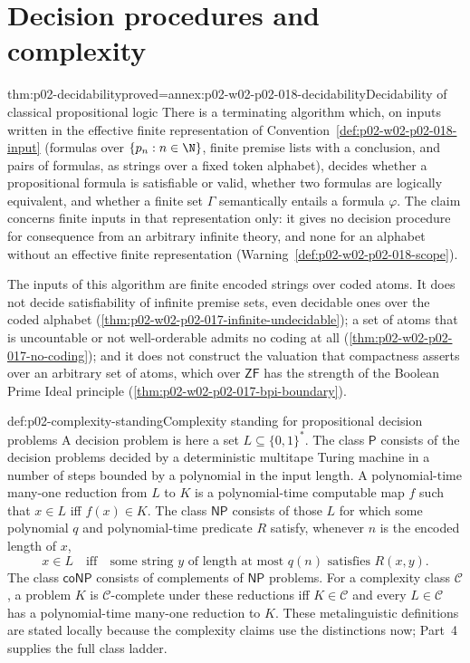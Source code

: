 \section{Decision procedures and complexity}
\label{sec:p02-prop-decision-complexity}

\begin{hbtheorem}{thm:p02-decidability}{proved=annex:p02-w02-p02-018-decidability}{Decidability of classical propositional logic}
There is a terminating algorithm which, on inputs written in the effective
finite representation of Convention~\ref{def:p02-w02-p02-018-input}
(formulas over \(\{p_n:n\in\N\}\), finite premise lists with a
conclusion, and pairs of formulas, as strings over a fixed token alphabet),
decides whether a propositional formula is satisfiable or valid, whether two
formulas are logically equivalent, and whether a finite set \(\Gamma\)
semantically entails a formula \(\varphi\).  The claim concerns finite
inputs in that representation only: it gives no decision procedure for
consequence from an arbitrary infinite theory, and none for an alphabet
without an effective finite representation
(Warning~\ref{def:p02-w02-p02-018-scope}).
\end{hbtheorem}

The inputs of this algorithm are finite encoded strings over coded atoms.
It does not decide satisfiability of infinite premise sets, even
decidable ones over the coded alphabet
(\cref{thm:p02-w02-p02-017-infinite-undecidable}); a set of atoms that
is uncountable or not well-orderable admits no coding at all
(\cref{thm:p02-w02-p02-017-no-coding}); and it does not construct the
valuation that compactness asserts over an arbitrary set of atoms, which
over \(\mathsf{ZF}\) has the strength of the Boolean Prime Ideal
principle (\cref{thm:p02-w02-p02-017-bpi-boundary}).

\begin{hbconvention}{def:p02-complexity-standing}{Complexity standing for propositional decision problems}
A decision problem is here a set \(L\subseteq\{0,1\}^*\).  The class
\(\mathsf P\) consists of the decision problems decided by a deterministic
multitape Turing machine in a number of steps bounded by a polynomial in the
input length.  A polynomial-time
many-one reduction from \(L\) to \(K\) is a polynomial-time computable map
\(f\) such that \(x\in L\) iff \(f(x)\in K\).  The class \(\mathsf{NP}\)
consists of those \(L\) for which some polynomial \(q\) and polynomial-time
predicate \(R\) satisfy, whenever \(n\) is the encoded length of \(x\),
\[
 x\in L\quad\text{iff}\quad
 \text{some string }y\text{ of length at most }q(n)\text{ satisfies }R(x,y).
\]
The class \(\mathsf{coNP}\) consists of complements of \(\mathsf{NP}\)
problems.  For a complexity class \(\mathcal C\), a problem \(K\) is
\(\mathcal C\)-complete under these reductions iff \(K\in\mathcal C\) and
every \(L\in\mathcal C\) has a polynomial-time many-one reduction to \(K\).
These metalinguistic definitions are stated locally because the complexity
claims use the distinctions now; Part~4 supplies the full class ladder.
\end{hbconvention}

